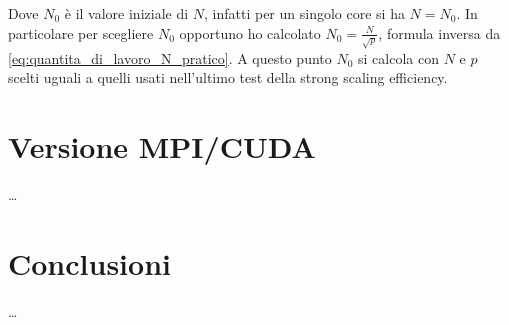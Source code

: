 \documentclass[12pt, a4paper]{article}
\begin{document}
Dove \(N_0\) è il valore iniziale di \(N\), infatti per un singolo core si ha \(N = N_0\).
In particolare per scegliere \(N_0\) opportuno ho calcolato \(N_0 = \frac{N}{\sqrt{p}}\), formula inversa da
\autoref{eq:quantita_di_lavoro_N_pratico}.
A questo punto \(N_0\) si calcola con \(N\) e \(p\) scelti uguali a quelli usati nell'ultimo test della strong scaling efficiency.

\section{Versione MPI/CUDA}

\dots

\section{Conclusioni}

\dots
\end{document}
